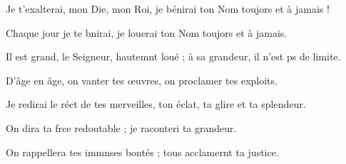 \item Je t’exalterai, mon Die, mon Roi,\psstar{} je bénirai ton Nom toujors et à jamais !
\item Chaque jour je te bnirai,\psstar{} je louerai ton Nom toujors et à jamais.
\item Il est grand, le Seigneur, hautemnt loué ;\psstar{} à sa grandeur, il n’est ps de limite.
\item D’âge en âge, on vanter tes œuvres,\psstar{} on proclamer tes exploits.
\item Je redirai le réct de tes merveilles,\psstar{} ton éclat, ta glire et ta splendeur.
\item On dira ta frce redoutable ;\psstar{} je raconteri ta grandeur.
\item On rappellera tes immnses bontés ;\psstar{} tous acclamernt ta justice.